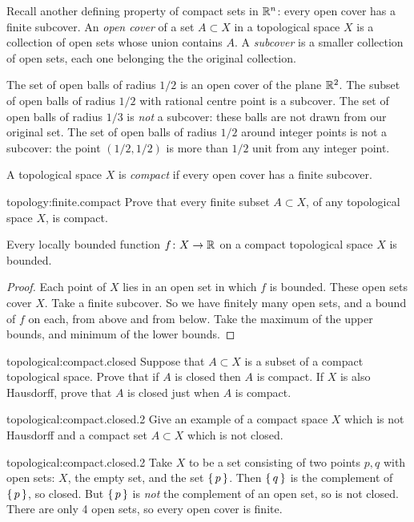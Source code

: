 Recall another defining property of compact sets in \(\mathbb{R}^{n}\): every open cover has a finite subcover.
An \emph{open cover} of a set \(A \subset X\) in a topological space \(X\) is a collection of open sets whose union contains \(A\).
A \emph{subcover} is a smaller collection of open sets, each one belonging the the original collection.
\begin{example}
The set of open balls of radius \(1/2\) is an open cover of the plane \(\mathbb{R}^{2}\).
The subset of open balls of radius \(1/2\) with rational centre point is a subcover.
The set of open balls of radius \(1/3\) is \emph{not} a subcover: these balls are not drawn from our original set.
The set of open balls of radius \(1/2\) around integer points is not a subcover: the point \((1/2,1/2)\) is more than \(1/2\) unit from any integer point.
\end{example}
A topological space \(X\) is \emph{compact} if every open cover has a finite subcover.
\begin{problem}{topology:finite.compact}
Prove that every finite subset \(A \subset X\), of any topological space \(X\), is compact.
\end{problem}
\begin{lemma}
Every locally bounded function \(f \colon X \to \mathbb{R}^{}\) on a compact topological space \(X\) is bounded.
\end{lemma}
\begin{proof}
Each point of \(X\) lies in an open set in which \(f\) is bounded.
These open sets cover \(X\).
Take a finite subcover.
So we have finitely many open sets, and a bound of \(f\) on each, from above and from below.
Take the maximum of the upper bounds, and minimum of the lower bounds.
\end{proof}
\begin{problem}{topological:compact.closed}
Suppose that \(A \subset X\) is a subset of a compact topological space.
Prove that if \(A\) is closed then \(A\) is compact.
If \(X\) is also Hausdorff, prove that \(A\) is closed just when \(A\) is compact.
\end{problem}
\begin{problem}{topological:compact.closed.2}
Give an example of a compact space \(X\) which is not Hausdorff and a compact set \(A \subset X\) which is not closed.
\end{problem}
\begin{answer}{topological:compact.closed.2}
Take \(X\) to be a set consisting of two points \(p,q\) with open sets: \(X\), the empty set, and the set \(\set{p}\).
Then \(\set{q}\) is the complement of \(\set{p}\), so closed.
But \(\set{p}\) is \emph{not} the complement of an open set, so is not closed.
There are only 4 open sets, so every open cover is finite.
\end{answer}

